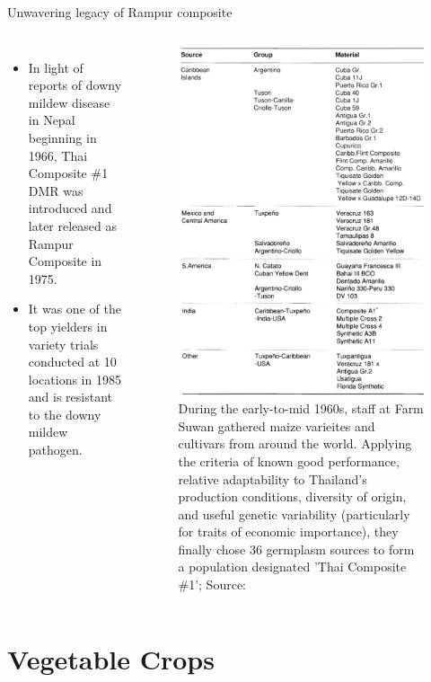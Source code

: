 \documentclass[11pt,dvipsnames,ignorenonframetext,aspectratio=169]{beamer}
\providecommand{\tightlist}{%
  \setlength{\itemsep}{0pt}\setlength{\parskip}{0pt}}
\newcommand{\bcolumns}{\begin{columns}[T, onlytextwidth]}
\newcommand{\ecolumns}{\end{columns}}
\begin{document}
\begin{frame}{Unwavering legacy of Rampur composite}
\protect\hypertarget{unwavering-legacy-of-rampur-composite}{}
\bcolumns
{}

\begin{itemize}
\tightlist
\item
  In light of reports of downy mildew disease in Nepal beginning in
  1966, Thai Composite \#1 DMR was introduced and later released as
  Rampur Composite in 1975.
\item
  It was one of the top yielders in variety trials conducted at 10
  locations in 1985 and is resistant to the downy mildew pathogen.
\end{itemize}


\begin{figure}
\includegraphics[width=0.4\linewidth]{../images/germplasm_assemblage_thai_composite1} \caption{During the early-to-mid 1960s, staff at Farm Suwan gathered maize varieites and cultivars from around the world. Applying the criteria of known good performance, relative adaptability to Thailand's production conditions, diversity of origin, and useful genetic variability (particularly for traits of economic importance), they finally chose 36 germplasm sources to form a population designated 'Thai Composite \#1'; Source: \cite{sriwatanapongse1993suwan}}\label{fig:thai-composite-germplasm-assembly}
\end{figure}

\ecolumns
\end{frame}

\hypertarget{vegetable-crops}{%
\section{Vegetable Crops}\label{vegetable-crops}}
\end{document}
